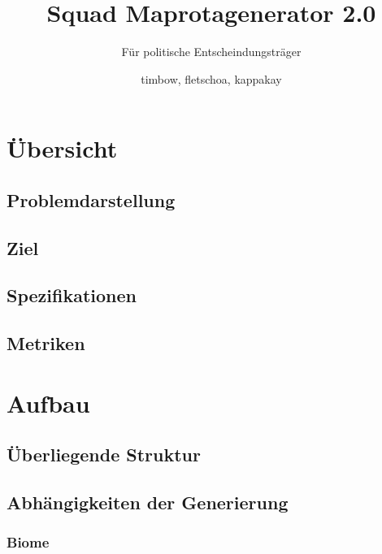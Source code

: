 \documentclass[a4paper, 11pt]{scrreprt}
\title{Squad Maprotagenerator 2.0}
\subtitle{Für politische Entscheindungsträger}
\author{timbow, fletschoa, kappakay}
\begin{document}
    
    \maketitle
    
    \tableofcontents
    \newpage


    \newpage
    \listoffigures
    \label{sec:abkuerzungverzeichnis}
    \newpage

    \begin{acronym}[Rota] %
    \end{acronym}


    \chapter{Übersicht}
    \section{Problemdarstellung}
    \section{Ziel}
    \section{Spezifikationen}
    \section{Metriken}



    \chapter{Aufbau}
    \section{Überliegende Struktur}
    \section{Abhängigkeiten der Generierung}
    \subsection{Biome}
\end{document}
